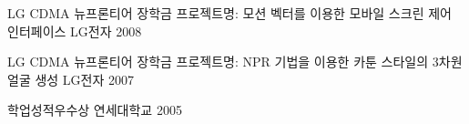 



\begin{cvhonors}

  \cvhonor
    {LG CDMA 뉴프론티어 장학금} %
    {프로젝트명: 모션 벡터를 이용한 모바일 스크린 제어 인터페이스} %
    {LG전자} %
    {2008} %

  \cvhonor
    {LG CDMA 뉴프론티어 장학금} %
    {프로젝트명:  NPR 기법을 이용한 카툰 스타일의 3차원 얼굴 생성} %
    {LG전자} %
    {2007} %

  \cvhonor
    {학업성적우수상} %
    {} %
    {연세대학교} %
    {2005} %


\end{cvhonors}

